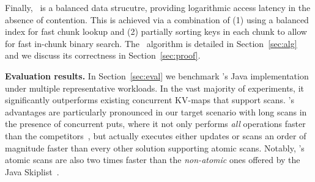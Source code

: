 Finally, \kiwi\ is a balanced data strucutre, providing logarithmic access latency in the absence of contention.
This is achieved via a combination of (1) using a balanced index for fast chunk lookup and (2) partially sorting keys in each
chunk to allow for fast in-chunk binary search. The \kiwi\ algorithm is detailed in Section~\ref{sec:alg}
and we discuss its correctness in Section~\ref{sec:proof}.


{\bf{Evaluation results.}}
In Section~\ref{sec:eval} we benchmark \kiwi's Java implementation under multiple representative workloads.
In the vast majority of  experiments, it significantly outperforms existing concurrent KV-maps that support scans.
\kiwi's advantages are particularly pronounced in our target scenario with long scans in the presence of concurrent puts, where
it not only performs \emph{all} operations faster than the competitors~\cite{BrownA12,BronsonCCO2010},
but actually executes either updates or scans an order of magnitude faster than every other solution supporting atomic scans.
Notably, \kiwi's atomic scans are also two times faster than the \emph{non-atomic}
ones offered by the Java Skiplist~\cite{JavaConcurrentSkipList}. 


